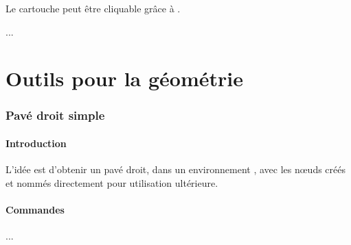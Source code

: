 \documentclass{article}
\newcommand\ctex[1]{\tcbox[vignettelatex]{#1}}
\begin{document}
\begin{codesortie}



\end{codesortie}

\begin{codeinfo}
Le \textsf{cartouche} peut être \og cliquable \fg{} grâce à \ctex{href}.
\end{codeinfo}

\begin{codetex}
\usepackage{hyperref}
...
\href{https://capytale2.ac-paris.fr/web/c/abcd-12345}{}
\end{codetex}

\begin{codesortie}
\href{https://capytale2.ac-paris.fr/web/c/abcd-12345}{}
\end{codesortie}

\newpage

\part{Outils pour la géométrie}

\section{Pavé droit \og simple \fg}\label{pave}

\subsection{Introduction}

\begin{codeidee}
L'idée est d'obtenir un pavé droit, dans un environnement \TikZ, avec les nœuds créés et nommés directement pour utilisation ultérieure.
\end{codeidee}

\subsection{Commandes}

\begin{codetex}
...
\end{codetex}
\end{document}
